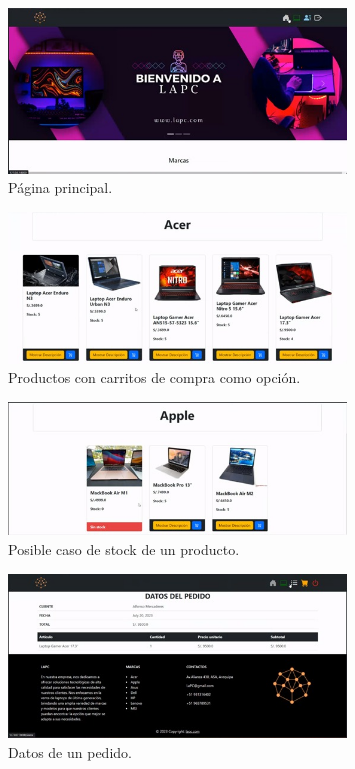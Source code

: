 \documentclass{article}
\begin{document}
    \begin{figure}[H]
		\centering
        \includegraphics[width=0.8\textwidth,keepaspectratio]{img/a1.jpeg}
		\caption{Página principal.}
    \end{figure}
    \begin{figure}[H]
		\centering
        \includegraphics[width=0.8\textwidth,keepaspectratio]{img/a2.jpeg}
		\caption{Productos con carritos de compra como opción.}
    \end{figure}
    \begin{figure}[H]
		\centering
        \includegraphics[width=0.8\textwidth,keepaspectratio]{img/a4.jpeg}
		\caption{Posible caso de stock de un producto.}
    \end{figure}
    \begin{figure}[H]
		\centering
        \includegraphics[width=0.8\textwidth,keepaspectratio]{img/a5.jpeg}
		\caption{Datos de un pedido.}
    \end{figure}
\end{document}
